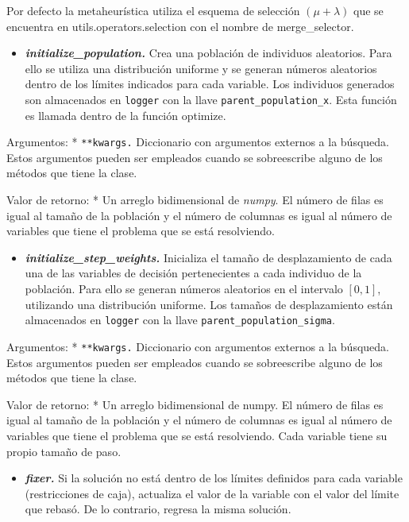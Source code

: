 \documentclass[11pt]{article}
\providecommand{\tightlist}{%
      \setlength{\itemsep}{0pt}\setlength{\parskip}{0pt}}
\begin{document}
Por defecto la metaheurística utiliza el esquema de selección
\((\mu + \lambda)\) que se encuentra en utils.operators.selection con el
nombre de merge\_selector.

\begin{itemize}
\tightlist
\item
  \emph{\textbf{initialize\_population.}} Crea una población de
  individuos aleatorios. Para ello se utiliza una distribución uniforme
  y se generan números aleatorios dentro de los límites indicados para
  cada variable. Los individuos generados son almacenados en
  \texttt{logger} con la llave \texttt{parent\_population\_x}. Esta
  función es llamada dentro de la función optimize.
\end{itemize}

Argumentos: * \texttt{**kwargs.} Diccionario con argumentos externos a
la búsqueda. Estos argumentos pueden ser empleados cuando se
sobreescribe alguno de los métodos que tiene la clase.

Valor de retorno: * Un arreglo bidimensional de \emph{numpy}. El número
de filas es igual al tamaño de la población y el número de columnas es
igual al número de variables que tiene el problema que se está
resolviendo.

\begin{itemize}
\tightlist
\item
  \emph{\textbf{initialize\_step\_weights.}} Inicializa el tamaño de
  desplazamiento de cada una de las variables de decisión pertenecientes
  a cada individuo de la población. Para ello se generan números
  aleatorios en el intervalo \([0,1]\), utilizando una distribución
  uniforme. Los tamaños de desplazamiento están almacenados en
  \texttt{logger} con la llave \texttt{parent\_population\_sigma}.
\end{itemize}

Argumentos: * \texttt{**kwargs.} Diccionario con argumentos externos a
la búsqueda. Estos argumentos pueden ser empleados cuando se
sobreescribe alguno de los métodos que tiene la clase.

Valor de retorno: * Un arreglo bidimensional de numpy. El número de
filas es igual al tamaño de la población y el número de columnas es
igual al número de variables que tiene el problema que se está
resolviendo. Cada variable tiene su propio tamaño de paso.

\begin{itemize}
\tightlist
\item
  \emph{\textbf{fixer.}} Si la solución no está dentro de los límites
  definidos para cada variable (restricciones de caja), actualiza el
  valor de la variable con el valor del límite que rebasó. De lo
  contrario, regresa la misma solución.
\end{itemize}
\end{document}
